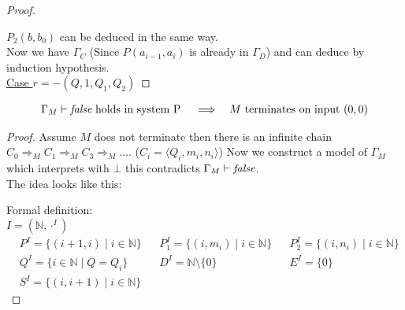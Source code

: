 \begin{proof}
\begin{figure}[H]
\end{figure}
$P_2(b,b_0)$ can be deduced in the same way.\\
Now we have $\Gamma_C$ (Since $P(a_{i-1},a_i)$ is already in $\Gamma_D$) and can deduce \false{} by induction hypothesis.\\
\underline{Case $r=-(Q,1,Q_1,Q_2)$}
\end{proof}
\begin{claim}
\begin{align*}
&\text{$\Gamma_M\vdash\emph{false}$ holds in system P} && \implies &\text{$M$ terminates on input $(0,0)$}
\end{align*}
\end{claim}
\begin{proof}
Assume $M$ does not terminate then there is an infinite chain $C_0\Rightarrow_M C_1\Rightarrow_M C_3\Rightarrow_M\dots$. ($C_i=\langle Q_i,m_i,n_i\rangle$) Now we construct a model of $\Gamma_M$ which interprets \false{} with $\bot$ this contradicts $\Gamma_M\vdash\emph{false}$.\\
The idea looks like this:\\
\begin{figure}[H]

\end{figure}
Formal definition:\\
$I=(\mathbb{N},\cdot^I)$
\begin{align*}
& P^I=\{(i+1,i)\mid i\in\mathbb{N}\} && P_1^I=\{(i,m_i)\mid i\in\mathbb{N}\} && P_2^I=\{(i,n_i)\mid i\in\mathbb{N}\}\\
& Q^I=\{ i\in\mathbb{N}\mid Q=Q_i\} && D^I=\mathbb{N}\setminus\{0\} && E^I=\{0\}\\
& S^I=\{(i,i+1)\mid i\in\mathbb{N}\}
\end{align*}
\end{proof}